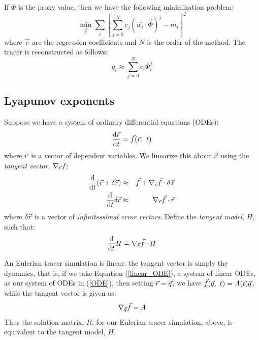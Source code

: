 \documentclass{article}
\begin{document}
If $\Phi$ is the proxy value, then we have the following minimization
problem:
\begin{equation}
	\min_{\vec c} \sum_i \left [ \sum_{j=0}^N c_j (\vec w_i \cdot \vec \Phi)^j - m_i \right ]^2
\end{equation}
where $\vec c$ are the regression coefficients and $N$ is the order of the
method. The tracer is reconstructed as follows:
\begin{equation}
	q_i \approx \sum_{j=0}^N c_i \Phi_i^j
\end{equation}

\subsection{Lyapunov exponents}

Suppose we have a system of ordinary differential equations (ODEs):
\begin{equation}
	\frac{\mathrm d \vec r}{\mathrm d t} = \vec f(\vec r, ~ t)
	\label{ODE}
\end{equation}
where $\vec r$ is a vector of dependent variables.
We linearize this about $\vec r$ using the {\it tangent vector},
$\nabla_{\vec r} f$:
\begin{eqnarray}
\frac{\mathrm d}{\mathrm d t} (\vec r + \delta \vec r) & \approx & \vec f + 
	\nabla_{\vec r} \vec f \cdot \delta \vec x \\
	\frac{\mathrm d}{\mathrm d t} \delta \vec r & \approx & \nabla_{\vec r} \vec f \cdot \vec r
\end{eqnarray}
where $\delta \vec r$ is a vector of {\it infinitessimal error vectors}.
Define the {\it tangent model}, $H$, such that:
\begin{equation} 
	\frac{\mathrm d}{\mathrm d t} H = \nabla_{\vec r} \vec f \cdot H \\
\end{equation}

An Eulerian tracer simulation is linear: the tangent vector is simply
the dynamics, that is,
if we take Equation (\ref{linear_ODE}), a system of linear ODEs,
as our system of ODEs in
(\ref{ODE}), then setting $\vec r=\vec q$, 
we have $\vec f(\vec q, ~t)=A(t) \vec q$,
while the tangent vector is given as:
\begin{equation}
	\nabla_{\vec q} \vec f = A
\end{equation}
Thus the solution matrix, $R$, for our Eulerian tracer simulation, above,
is equivalent to the tangent model, $H$.
\end{document}
